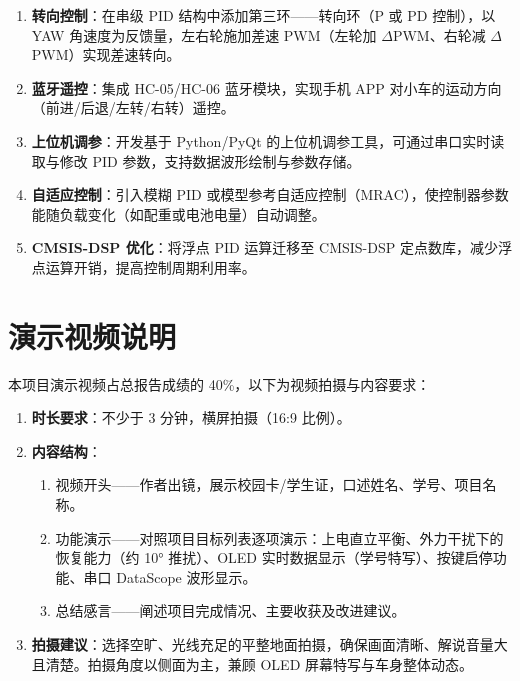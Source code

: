\documentclass[12pt,a4paper,UTF8]{ctexrep}
\begin{document}
\begin{enumerate}
  \item \textbf{转向控制}：在串级 PID 结构中添加第三环——转向环（P 或 PD 控制），以 YAW 角速度为反馈量，左右轮施加差速 PWM（左轮加 $\Delta$PWM、右轮减 $\Delta$PWM）实现差速转向。
  \item \textbf{蓝牙遥控}：集成 HC-05/HC-06 蓝牙模块，实现手机 APP 对小车的运动方向（前进/后退/左转/右转）遥控。
  \item \textbf{上位机调参}：开发基于 Python/PyQt 的上位机调参工具，可通过串口实时读取与修改 PID 参数，支持数据波形绘制与参数存储。
  \item \textbf{自适应控制}：引入模糊 PID 或模型参考自适应控制（MRAC），使控制器参数能随负载变化（如配重或电池电量）自动调整。
  \item \textbf{CMSIS-DSP 优化}：将浮点 PID 运算迁移至 CMSIS-DSP 定点数库，减少浮点运算开销，提高控制周期利用率。
\end{enumerate}

\section{演示视频说明}

本项目演示视频占总报告成绩的 40\%，以下为视频拍摄与内容要求：

\begin{enumerate}
  \item \textbf{时长要求}：不少于 3 分钟，横屏拍摄（16:9 比例）。
  \item \textbf{内容结构}：
    \begin{enumerate}
      \item 视频开头——作者出镜，展示校园卡/学生证，口述姓名、学号、项目名称。
      \item 功能演示——对照项目目标列表逐项演示：上电直立平衡、外力干扰下的恢复能力（约 10° 推扰）、OLED 实时数据显示（学号特写）、按键启停功能、串口 DataScope 波形显示。
      \item 总结感言——阐述项目完成情况、主要收获及改进建议。
    \end{enumerate}
  \item \textbf{拍摄建议}：选择空旷、光线充足的平整地面拍摄，确保画面清晰、解说音量大且清楚。拍摄角度以侧面为主，兼顾 OLED 屏幕特写与车身整体动态。
\end{enumerate}
\end{document}
